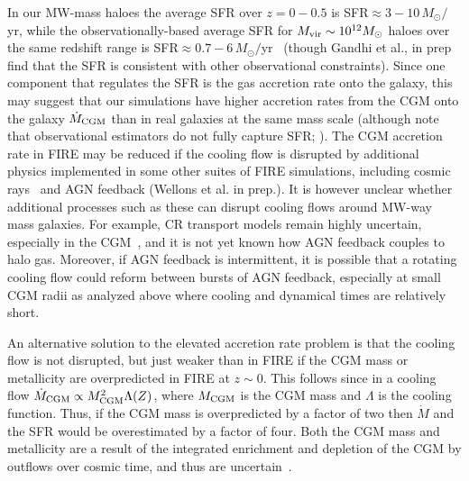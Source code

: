 \documentclass[fleqn,usenatbib]{mnras}
\newcommand{\Mdot}{\dot{M}}
\begin{document}
In our MW-mass haloes the average SFR over $z=0-0.5$ is SFR$\approx 3-10\,M_\odot/$yr, while the observationally-based average SFR for $M_{\rm vir} \sim 10^{12} M_\odot$ haloes over the same redshift range is SFR$\approx 0.7-6\,M_\odot/$yr~\citep{Behroozi2013} (though Gandhi et al., in prep find that the SFR is consistent with other observational constraints).
Since one component that regulates the SFR is the gas accretion rate onto the galaxy, this may suggest that our simulations have higher accretion rates from the CGM onto the galaxy $\Mdot_{\rm CGM}$ than in real galaxies at the same mass scale (although note that observational estimators do not fully capture SFR; \citealt{FloresVelazquez2021}).
The CGM accretion rate in FIRE may be reduced if the cooling flow is disrupted by additional physics implemented in some other suites of FIRE simulations, including cosmic rays~\citep{Chan2019, Hopkins2020a, Hopkins2021e, Hopkins2021d} and AGN feedback (Wellons et al. in prep.).
It is however unclear whether additional processes such as these can disrupt cooling flows around MW-way mass galaxies.
For example, CR transport models remain highly uncertain, especially in the CGM~\citep{Hopkins2021, Quataert2021, Quataert2021a}, and it is not yet known how AGN feedback couples to halo gas.
Moreover, if AGN feedback is intermittent, it is possible that a rotating cooling flow could reform between bursts of AGN feedback, especially at small CGM radii as analyzed above where cooling and dynamical times are relatively short. 

An alternative solution to the elevated accretion rate problem is that the cooling flow is not disrupted, but just weaker than in FIRE if the CGM mass or metallicity are overpredicted in FIRE at $z\sim0$.
This follows since in a cooling flow $\Mdot_{\rm CGM}\propto M_{\rm CGM}^2 \Lambda(Z)$, where $M_{\rm CGM}$ is the CGM mass and $\Lambda$ is the cooling function.
Thus, if the CGM mass is overpredicted by a factor of two then $\Mdot$ and the SFR would be overestimated by a factor of four.
Both the CGM mass and metallicity are a result of the integrated enrichment and depletion of the CGM by outflows over cosmic time, and thus are uncertain~\citep[e.g.,][]{Davies2021, Kelly2021}.
\end{document}

